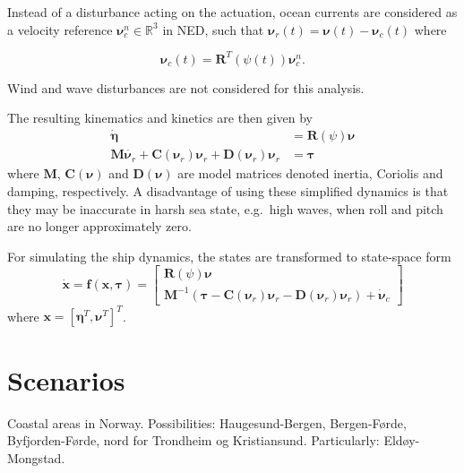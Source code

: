 Instead of a disturbance acting on the actuation, ocean currents are considered as a velocity reference $\boldsymbol{\nu}_c^n \in \mathbb{R}^3$ in NED, such that $\boldsymbol{\nu}_r(t) = \boldsymbol{\nu}(t) - \boldsymbol{\nu}_c(t)$ where 

\begin{equation}
\boldsymbol{\nu}_c(t) = \boldsymbol{R}^T(\psi(t)) \boldsymbol{\nu}_c^n.
\end{equation}

 Wind and wave disturbances are not considered for this analysis.

The resulting kinematics and kinetics are then given by
\begin{subequations} 
	\begin{align}
	\dot{\boldsymbol{\eta}} &= \boldsymbol{R}(\psi)\boldsymbol{\nu} \\ 
	\boldsymbol{M}\dot{\boldsymbol{\nu}_r}+\boldsymbol{C}(\boldsymbol{\nu}_r)\boldsymbol{\nu}_r + \boldsymbol{D}(\boldsymbol{\nu}_r)\boldsymbol{\nu}_r  &= \boldsymbol{\tau}
	\end{align}
\end{subequations}
where $\boldsymbol{M}$, $\boldsymbol{C}(\boldsymbol{\nu})$ and $\boldsymbol{D}(\boldsymbol{\nu})$ are model matrices denoted inertia, Coriolis and damping, respectively.
A disadvantage of using these simplified dynamics is that they may be inaccurate in harsh sea state, e.g.\ high waves, when roll and pitch are no longer approximately zero. 

For simulating the ship dynamics, the states are transformed to state-space form
\begin{equation}
	\label{eq:x_dot}
	\dot{\boldsymbol{x}} = \boldsymbol{f}(\boldsymbol{x}, \boldsymbol{\tau}) = \begin{bmatrix}
		\boldsymbol{R}(\psi)\boldsymbol{\nu} \\
		\boldsymbol{M}^{-1}(\boldsymbol{\tau}  - \boldsymbol{C}(\boldsymbol{\nu}_r)\boldsymbol{\nu}_r - \boldsymbol{D}(\boldsymbol{\nu}_r)\boldsymbol{\nu}_r) + \dot{\boldsymbol{\nu}}_c
	\end{bmatrix}
\end{equation}
where $\boldsymbol{x}= [\boldsymbol{\eta}^T, \boldsymbol{\nu}^T]^T$.



\section{Scenarios}
Coastal areas in Norway. Possibilities: Haugesund-Bergen, Bergen-Førde, Byfjorden-Førde, nord for Trondheim og Kristiansund. Particularly: Eldøy-Mongstad.

